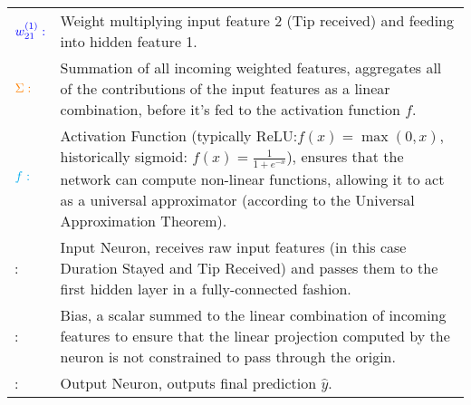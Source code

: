 \documentclass{solutionclass} %
\begin{document}
    \begin{solution}
        \begin{tabular}{p{3cm} p{11cm}}
            \Large{$\textcolor{blue}{w^{(1)}_{21}:}$} & Weight multiplying input feature 2 (Tip received) and feeding into hidden feature 1.
            \vspace{0.7cm} \\
            
            \Large{$\textcolor{orange}{\Sigma:}$} & Summation of all incoming weighted features, aggregates all of the contributions of the input features as a linear combination, before it's fed to the activation function $f$.
            \vspace{0.7cm} \\
            
            \Large{$\textcolor{cyan}{f:}$} & Activation Function (typically ReLU:\@ $f(x)=\max(0,x)$, historically sigmoid: $f(x)=\frac{1}{1+e^{-x}}$), ensures that the network can compute non-linear functions, allowing it to act as a universal approximator (according to the Universal Approximation Theorem).
            \vspace{0.7cm} \\

            \begin{tikzpicture}\node[circle, draw=red, thick, fill=red!10, minimum size=8mm] {};\end{tikzpicture} : & Input Neuron, receives raw input features (in this case Duration Stayed and Tip Received) and passes them to the first hidden layer in a fully-connected fashion.
            \vspace{0.7cm} \\

            \begin{tikzpicture}\node[circle, draw=orange, thick, fill=orange!10, minimum size=8mm] {};\end{tikzpicture} : & Bias, a scalar summed to the linear combination of incoming features to ensure that the linear projection computed by the neuron is not constrained to pass through the origin.
            \vspace{0.7cm} \\

            \begin{tikzpicture}\node[circle, draw=green, thick, fill=green!10, minimum size=8mm] {};\end{tikzpicture} : & Output Neuron, outputs final prediction $\hat{y}$.
            \vspace{0.7cm} \\


\end{tabular}
\end{solution}
\end{document}
